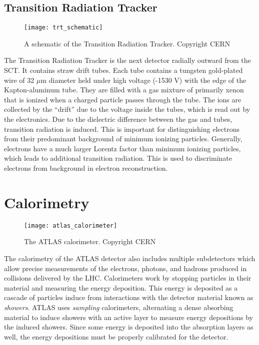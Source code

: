 \subsection{Transition Radiation Tracker}
\begin{figure}[tbp]
\caption{A schematic of the Transition Radiation Tracker. Copyright CERN} \label{fig:trt_schematic}
\texttt{[image: trt\_schematic]}
\end{figure}
The Transition Radiation Tracker is the next detector radially outward from the SCT.
It contains straw drift tubes.
Each tube contains a tungsten gold-plated wire of 32 $\mu$m diameter held under high voltage (-1530 V) with the edge of the Kapton-aluminum tube.
They are filled with a gas mixture of primarily xenon that is ionized when a charged particle passes through the tube.
The ions are collected by the ``drift'' due to the voltage inside the tubes, which is read out by the electronics.
Due to the dielectric difference between the gas and tubes, transition radiation is induced.
This is important for distinguishing electrons from their predominant background of minimum ionizing particles.
Generally, electrons have a much larger Lorentz factor than minimum ionizing particles, which leads to additional transition radiation.
This is used to discriminate electrons from background in electron reconstruction.

\section{Calorimetry}
\begin{figure}[tbp]
\caption{The ATLAS calorimeter. Copyright CERN} \label{fig:atlas_calorimeter}
\texttt{[image: atlas\_calorimeter]}
\end{figure}

The calorimetry of the ATLAS detector also includes multiple subdetectors which allow precise measurements of the electrons, photons, and hadrons produced in collisions delivered by the LHC.
Calorimeters work by stopping particles in their material and measuring the energy deposition.
This energy is deposited as a cascade of particles induce from interactions with the detector material known as \textit{showers}.
ATLAS uses \textit{sampling} calorimeters, alternating a dense absorbing material to induce showers with an active layer to measure energy depositions by the induced showers.
Since some energy is deposited into the absorption layers as well, the energy depositions must be properly calibrated for the detector.

